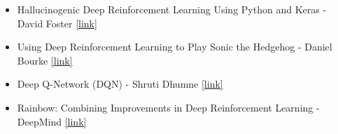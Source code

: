 \documentclass[12pt, a4paper]{article}
\begin{document}
\begin{itemize}
	\item Hallucinogenic Deep Reinforcement Learning Using Python and Keras - David Foster \href{https://medium.com/applied-data-science/how-to-build-your-own-world-model-using-python-and-keras-64fb388ba459}{[link]}
	\item Using Deep Reinforcement Learning to Play Sonic the Hedgehog - Daniel Bourke \href{https://mrdbourke.medium.com/the-world-model-of-a-hedgehog-6ff056a6dc7f}{[link]}
	\item Deep Q-Network (DQN) - Shruti Dhumne \href{https://medium.com/@shruti.dhumne/deep-q-network-dqn-90e1a8799871}{[link]}
	\item Rainbow: Combining Improvements in Deep Reinforcement Learning - 
	DeepMind \href{https://arxiv.org/pdf/1710.02298}{[link]}
\end{itemize}
\end{document}
